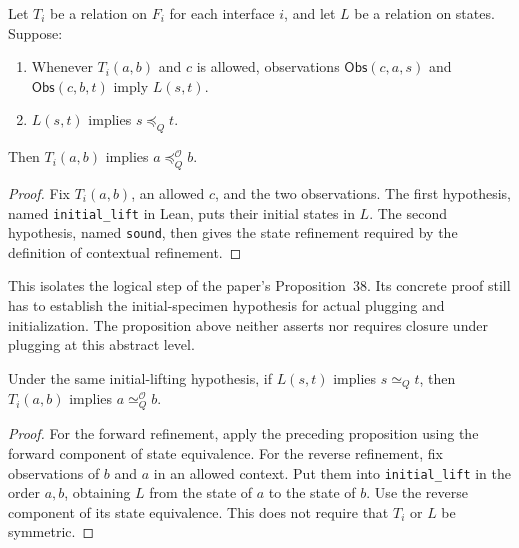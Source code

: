 \begin{proposition}\label{term:initial-lifting}
Let $T_i$ be a relation on $F_i$ for each interface $i$, and let $L$ be
a relation on states. Suppose:
\begin{enumerate}
\item Whenever $T_i(a,b)$ and $c$ is allowed, observations
  $\mathsf{Obs}(c,a,s)$ and $\mathsf{Obs}(c,b,t)$ imply $L(s,t)$.
\item $L(s,t)$ implies $s\preceq_Q t$.
\end{enumerate}
Then $T_i(a,b)$ implies $a\preceq_Q^{\mathcal O}b$.
\end{proposition}
\begin{proof}
Fix $T_i(a,b)$, an allowed $c$, and the two observations. The first
hypothesis, named \texttt{initial\_lift} in Lean, puts their initial states
in $L$. The second hypothesis, named \texttt{sound}, then gives the state
refinement required by the definition of contextual refinement.
\end{proof}
This isolates the logical step of the paper's Proposition~38. Its concrete
proof still has to establish the initial-specimen hypothesis for actual
plugging and initialization. The proposition above neither asserts nor
requires closure under plugging at this abstract level.

\begin{proposition}
Under the same initial-lifting hypothesis, if $L(s,t)$ implies
$s\simeq_Q t$, then $T_i(a,b)$ implies $a\simeq_Q^{\mathcal O}b$.
\end{proposition}
\begin{proof}
For the forward refinement, apply the preceding proposition using the
forward component of state equivalence. For the reverse refinement, fix
observations of $b$ and $a$ in an allowed context. Put them into
\texttt{initial\_lift} in the order $a,b$, obtaining $L$ from the state
of $a$ to the state of $b$. Use the reverse component of its state
equivalence. This does not require that $T_i$ or $L$ be symmetric.
\end{proof}
